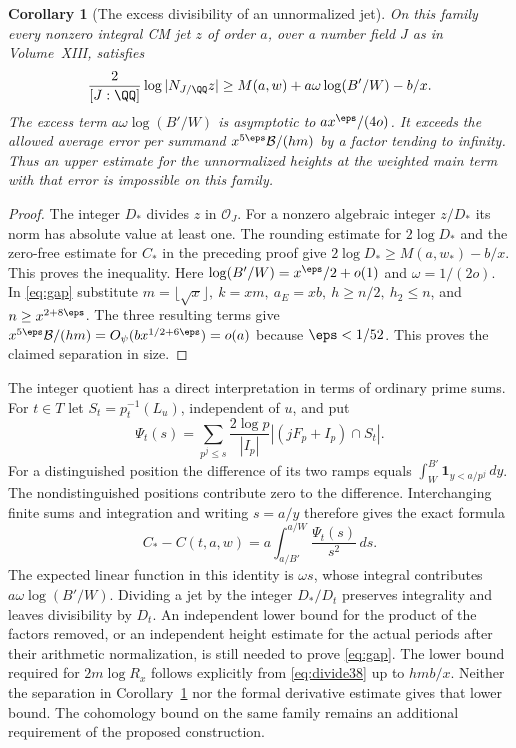 \documentclass[a4paper,11pt]{article}
\newtheorem{corollary}[proposition]{Corollary}
\theoremstyle{definition}
\theoremstyle{remark}
\numberwithin{equation}{section}
\begin{document}
\begin{corollary}[The excess divisibility of an unnormalized jet]\label{cor:excess38}
On this family every nonzero integral CM jet \(z\) of order \(a\), over a number field \(J\) as in Volume~XIII, satisfies
\[
 \frac{2}{[J:\QQ]}\log|N_{J/\QQ}z|
          \ge M(a,w)+a\omega\log(B'/W)-b/x .
\]
The excess term \(a\omega\log(B'/W)\) is asymptotic to \(a x^\eps/(4o)\). It exceeds the allowed average error per summand \(x^{5\eps}\mathcal B/(hm)\) by a factor tending to infinity. Thus an upper estimate for the unnormalized heights at the weighted main term with that error is impossible on this family.
\end{corollary}
\begin{proof}
The integer \(D_*\) divides \(z\) in \(\mathcal O_J\). For a nonzero algebraic integer \(z/D_*\) its norm has absolute value at least one. The rounding estimate for \(2\log D_*\) and the zero-free estimate for \(C_*\) in the preceding proof give \(2\log D_*\ge M(a,w_*)-b/x\). This proves the inequality. Here \(\log(B'/W)=x^\eps/2+o(1)\) and \(\omega=1/(2o)\). In \eqref{eq:gap} substitute \(m=\lfloor\sqrt x\rfloor,\ k=xm,\ a_E=xb,\ h\ge n/2,\ h_2\le n\), and \(n\ge x^{2+8\eps}\). The three resulting terms give \(x^{5\eps}\mathcal B/(hm)=O_\psi(bx^{1/2+6\eps})=o(a)\) because \(\eps<1/52\). This proves the claimed separation in size.
\end{proof}

The integer quotient has a direct interpretation in terms of ordinary prime sums. For \(t\in T\) let \(S_t=p_t^{-1}(L_u)\), independent of \(u\), and put
\[
 \Psi_t(s)=\sum_{p^j\le s}\frac{2\log p}{|I_p|}
                           |(jF_p+I_p)\cap S_t| .
\]
For a distinguished position the difference of its two ramps equals
\(\int_W^{B'}\mathbf1_{y<a/p^j}\,dy\). The nondistinguished positions contribute zero to the difference. Interchanging finite sums and integration and writing \(s=a/y\) therefore gives the exact formula
\[
     C_*-C(t,a,w)=a\int_{a/B'}^{a/W}\frac{\Psi_t(s)}{s^2}\,ds .
\]
The expected linear function in this identity is \(\omega s\), whose integral contributes \(a\omega\log(B'/W)\). Dividing a jet by the integer \(D_*/D_t\) preserves integrality and leaves divisibility by \(D_t\). An independent lower bound for the product of the factors removed, or an independent height estimate for the actual periods after their arithmetic normalization, is still needed to prove \eqref{eq:gap}. The lower bound required for \(2m\log R_x\) follows explicitly from \eqref{eq:divide38} up to \(hm b/x\). Neither the separation in Corollary~\ref{cor:excess38} nor the formal derivative estimate gives that lower bound. The cohomology bound on the same family remains an additional requirement of the proposed construction.
\end{document}
